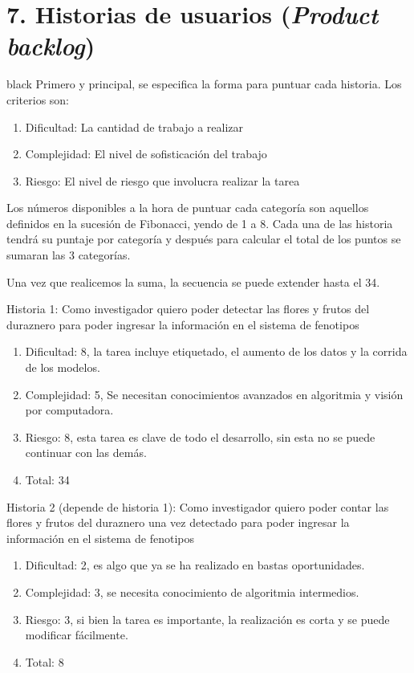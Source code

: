 \documentclass[
11pt, %
]{charter}
\begin{document}
\section{7. Historias de usuarios (\textit{Product backlog})}
\label{sec:backlog}
\begin{consigna}{black}
Primero y principal, se especifica la forma para puntuar cada historia. Los criterios
son:
\begin{enumerate}
	\item Dificultad: La cantidad de trabajo a realizar
	\item Complejidad: El nivel de sofisticación del trabajo
	\item Riesgo: El nivel de riesgo que involucra realizar la tarea
\end{enumerate}

Los números disponibles a la hora de puntuar cada categoría son aquellos definidos en la sucesión de Fibonacci, yendo de 1 a 8. Cada una de las historia tendrá su puntaje por categoría y después para calcular el total de los puntos se sumaran las 3 categorías.

Una vez que realicemos la suma, la secuencia se puede extender hasta el 34.


Historia 1:
Como investigador quiero poder detectar las flores y frutos del duraznero para poder ingresar la información en el sistema de fenotipos
\begin{enumerate}
	\item Dificultad: 8, la tarea incluye etiquetado, el aumento de los datos y la corrida de los modelos.
	\item Complejidad: 5, Se necesitan conocimientos avanzados en algoritmia y visión por computadora.
	\item Riesgo: 8, esta tarea es clave de todo el desarrollo, sin esta no se puede continuar con las demás.
	\item Total: 34
\end{enumerate}


Historia 2 (depende de historia 1):
Como investigador quiero poder contar las flores y frutos del duraznero una vez detectado para poder ingresar la información en el sistema de fenotipos
\begin{enumerate}
	\item Dificultad: 2, es algo que ya se ha realizado en bastas oportunidades.
	\item Complejidad: 3, se necesita conocimiento de algoritmia intermedios.
	\item Riesgo: 3, si bien la tarea es importante, la realización es corta y se puede modificar fácilmente.
	\item Total: 8
\end{enumerate}


\end{consigna}
\end{document}
